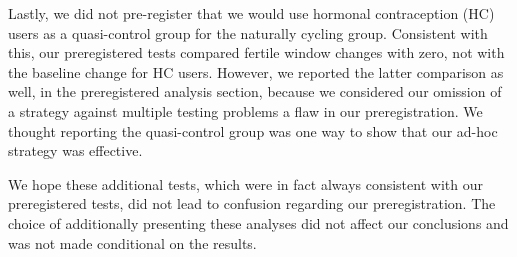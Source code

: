 \documentclass[]{article}
\begin{document}
Lastly, we did not pre-register that we would use hormonal contraception
(HC) users as a quasi-control group for the naturally cycling group.
Consistent with this, our preregistered tests compared fertile window
changes with zero, not with the baseline change for HC users. However,
we reported the latter comparison as well, in the preregistered analysis
section, because we considered our omission of a strategy against
multiple testing problems a flaw in our preregistration. We thought
reporting the quasi-control group was one way to show that our ad-hoc
strategy was effective.

We hope these additional tests, which were in fact always consistent
with our preregistered tests, did not lead to confusion regarding our
preregistration. The choice of additionally presenting these analyses
did not affect our conclusions and was not made conditional on the
results.
\end{document}
